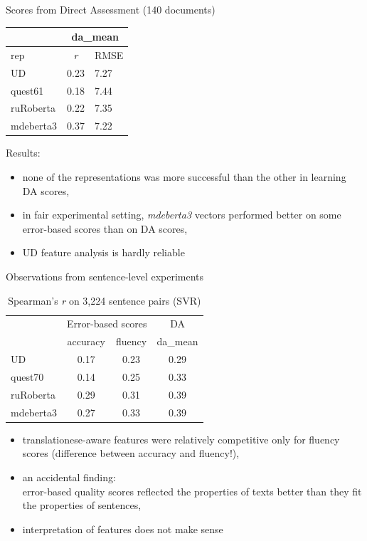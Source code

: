 \documentclass[11pt]{beamer} %
\begin{document}
\begin{frame}{Scores from Direct Assessment (140 documents)}
	
\begin{table}[H]
	\centering
	\begin{tabular}{l|cl}
		\toprule
		& \multicolumn{2}{c}{da\_mean} \\
		\midrule
		rep       & \textit{r}  & RMSE \\
		\midrule
		UD        & 0.23 & 7.27 \\
		quest61   & 0.18 & 7.44 \\
		\midrule
		ruRoberta & 0.22 & 7.35 \\
		mdeberta3 & 0.37 & 7.22 \\
		\bottomrule
	\end{tabular}
\end{table}
	Results:
	\begin{itemize}
		\item none of the representations was more successful than the other in learning DA scores,
		\item in fair experimental setting, \textit{mdeberta3} vectors performed better on some error-based scores than on DA scores,
		\item UD feature analysis is hardly reliable
	\end{itemize}
\end{frame}

\begin{frame}{Observations from sentence-level experiments}
	
	\begin{table}[]
		\centering
		\begin{tabular}{l|cc|c}
			\toprule
			& \multicolumn{2}{c|}{Error-based scores} & DA \\
			&  accuracy    &     fluency      & da\_mean \\
			\midrule  
			UD          & 0.17 &  0.23  & 0.29 \\
			quest70     & 0.14  & 0.25  & 0.33 \\
			\hline  
			ruRoberta    & 0.29  & 0.31 & 0.39 \\ 
			mdeberta3    & 0.27  & 0.33 & 0.39 \\ 
			\bottomrule
		\end{tabular}
		\caption{Spearman's \textit{r} on 3,224 sentence pairs (SVR)}
	\end{table}
	
	\begin{itemize}
		\item translationese-aware features were relatively competitive only for fluency scores (difference between accuracy and fluency!),
		\item an accidental finding: \\error-based quality scores reflected the properties of texts better than they fit the properties of sentences,
		\item interpretation of features does not make sense   
	\end{itemize}
\end{frame}
\end{document}
